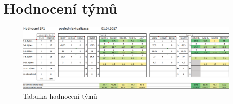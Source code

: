 \chapter{Hodnocení týmů} \label{ap:ranking}

\begin{figure}
\includegraphics[width=\textwidth]{../png/ranking.png}
\caption{Tabulka hodnocení týmů} \label{picture:ranking}
\end{figure}
